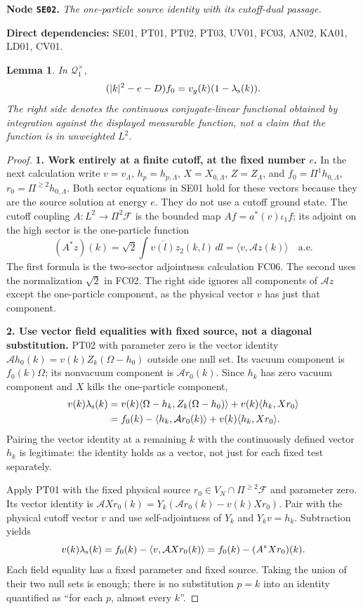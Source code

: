 \documentclass[11pt,a4paper]{article}
\newtheorem{lemma}[theorem]{Lemma}
\theoremstyle{remark}\newtheorem{remark}[theorem]{Remark}
\newcommand{\F}{\mathcal F}\newcommand{\Q}{\mathcal Q}\newcommand{\HH}{\mathcal H}
\newcommand{\node}[3]{\par\Needspace{6\baselineskip}\smallskip\hypertarget{node:#1}{}\label{nodepage:#1}\noindent\textbf{Node \texttt{#1}.} \textit{#2.}\par\noindent\textbf{Direct dependencies:} #3.\par}
\begin{document}
\node{SE02}{The one-particle source identity with its cutoff-dual passage}{SE01, PT01, PT02, PT03, UV01, FC03, AN02, KA01, LD01, CV01}
\begin{lemma}\label{lem:keyidentity}
In $\Q_1^{\times}$,
\begin{equation}
 (|k|^2-e-D)f_0=v_g(k)(1-\lambda_{\rm s}(k)).
 \label{eq:keyidentity}
\end{equation}
The right side denotes the continuous conjugate-linear functional obtained by integration against the displayed measurable function, not a claim that the function is in unweighted $L^2$.
\end{lemma}
\begin{proof}
\textbf{1. Work entirely at a finite cutoff, at the fixed number $e$.}
In the next calculation write $v=v_\Lambda$, $h_p=h_{p,\Lambda}$, $X=X_{0,\Lambda}$, $Z=Z_\Lambda$, and $f_0=\Pi^1h_{0,\Lambda}$, $r_0=\Pi^{\geq2}h_{0,\Lambda}$. Both sector equations in SE01 hold for these vectors because they are the source solution at energy $e$. They do not use a cutoff ground state. The cutoff coupling $A:L^2\to\Pi^2\F$ is the bounded map $Af=a^*(v)\iota_1f$; its adjoint on the high sector is the one-particle function
\[
 (A^*z)(k)=\sqrt2\int\overline{v(l)}z_2(k,l)\,dl
         =\langle v,\mathcal Az(k)\rangle
 \quad\text{a.e.}
\]
The first formula is the two-sector adjointness calculation FC06. The second uses the normalization $\sqrt2$ in FC02. The right side ignores all components of $\mathcal Az$ except the one-particle component, as the physical vector $v$ has just that component.

\textbf{2. Use vector field equalities with fixed source, not a diagonal substitution.}
PT02 with parameter zero is the vector identity
$\mathcal Ah_0(k)=v(k)Z_k(\Omega-h_0)$ outside one null set. Its vacuum component is $f_0(k)\Omega$; its nonvacuum component is $\mathcal Ar_0(k)$. Since $h_k$ has zero vacuum component and $X$ kills the one-particle component,
\begin{align*}
 v(k)\lambda_{\rm s}(k)
 &=v(k)\langle\Omega-h_k,Z_k(\Omega-h_0)\rangle
        +v(k)\langle h_k,Xr_0\rangle\\
 &=f_0(k)-\langle h_k,\mathcal Ar_0(k)\rangle
        +v(k)\langle h_k,Xr_0\rangle.
\end{align*}
Pairing the vector identity at a remaining $k$ with the continuously defined vector $h_k$ is legitimate: the identity holds as a vector, not just for each fixed test separately.

Apply PT01 with the fixed physical source $r_0\in V_N\cap\Pi^{\geq2}\F$ and parameter zero. Its vector identity is
$\mathcal A Xr_0(k)=Y_k(\mathcal Ar_0(k)-v(k)Xr_0)$.
Pair with the physical cutoff vector $v$ and use self-adjointness of $Y_k$ and $Y_kv=h_k$. Subtraction yields
\[
 v(k)\lambda_{\rm s}(k)=f_0(k)-\langle v,\mathcal A Xr_0(k)\rangle
                       =f_0(k)-(A^*Xr_0)(k).
\]
Each field equality has a fixed parameter and fixed source. Taking the union of their two null sets is enough; there is no substitution $p=k$ into an identity quantified as ``for each $p$, almost every $k$''.


\end{proof}
\end{document}
